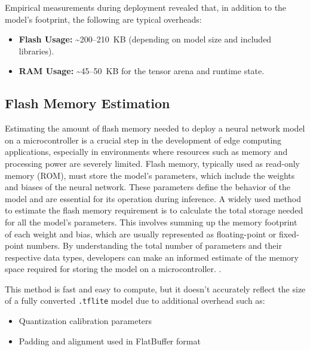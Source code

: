 Empirical measurements during deployment revealed that, in addition to the model's footprint, the following are typical overheads:

\begin{itemize}
    \item \textbf{Flash Usage:} \textasciitilde200--210~KB (depending on model size and included libraries).
    \item \textbf{RAM Usage:} \textasciitilde45--50~KB for the tensor arena and runtime state.
\end{itemize}





\clearpage

\subsection{Flash Memory Estimation}

Estimating the amount of flash memory needed to deploy a neural network model on a microcontroller is a crucial step in the development of edge computing applications, especially in environments where resources such as memory and processing power are severely limited. Flash memory, typically used as read-only memory (ROM), must store the model's parameters, which include the weights and biases of the neural network. These parameters define the behavior of the model and are essential for its operation during inference. A widely used method to estimate the flash memory requirement is to calculate the total storage needed for all the model's parameters. This involves summing up the memory footprint of each weight and bias, which are usually represented as floating-point or fixed-point numbers. By understanding the total number of parameters and their respective data types, developers can make an informed estimate of the memory space required for storing the model on a microcontroller. \cite{pau2023tiny}.

This method is fast and easy to compute, but it doesn't accurately reflect the size of a fully converted \texttt{.tflite} model due to additional overhead such as:
\begin{itemize}
    \item Quantization calibration parameters
    \item Padding and alignment used in FlatBuffer format \cite{manor2022custom}
\end{itemize}



